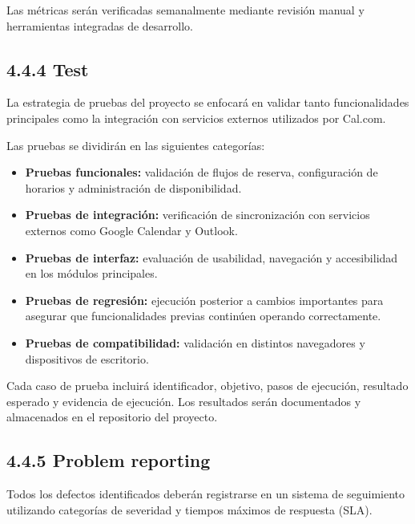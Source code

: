 \documentclass[12pt,a4paper]{article}
\begin{document}
Las métricas serán verificadas semanalmente mediante revisión manual y herramientas integradas de desarrollo.

\subsection{4.4.4 Test}

La estrategia de pruebas del proyecto se enfocará en validar tanto funcionalidades principales como la integración con servicios externos utilizados por Cal.com.

Las pruebas se dividirán en las siguientes categorías:

\begin{itemize}
    \item \textbf{Pruebas funcionales:} validación de flujos de reserva, configuración de horarios y administración de disponibilidad.
    
    \item \textbf{Pruebas de integración:} verificación de sincronización con servicios externos como Google Calendar y Outlook.
    
    \item \textbf{Pruebas de interfaz:} evaluación de usabilidad, navegación y accesibilidad en los módulos principales.
    
    \item \textbf{Pruebas de regresión:} ejecución posterior a cambios importantes para asegurar que funcionalidades previas continúen operando correctamente.
    
    \item \textbf{Pruebas de compatibilidad:} validación en distintos navegadores y dispositivos de escritorio.
\end{itemize}

Cada caso de prueba incluirá identificador, objetivo, pasos de ejecución, resultado esperado y evidencia de ejecución. Los resultados serán documentados y almacenados en el repositorio del proyecto.

\subsection{4.4.5 Problem reporting}

Todos los defectos identificados deberán registrarse en un sistema de seguimiento utilizando categorías de severidad y tiempos máximos de respuesta (SLA).
\end{document}
